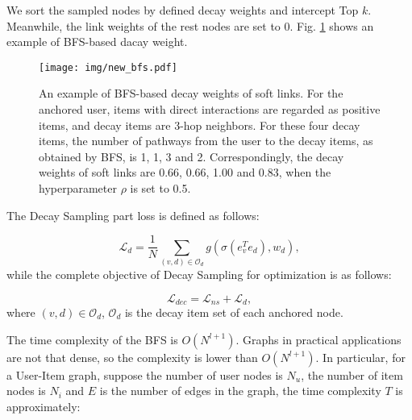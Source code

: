 We sort the sampled nodes by defined decay weights and intercept Top $k$. Meanwhile, the link weights of the rest nodes are set to 0. 
Fig. \ref{fig:decayf} shows an example of BFS-based dacay weight.

\begin{figure}[t]
\centering
\texttt{[image: img/new\_bfs.pdf]}
\caption{An example of BFS-based decay weights of soft links. For the anchored user, items with direct interactions are regarded as positive items, and decay items are 3-hop neighbors. For these four decay items, the number of pathways from the user to the decay items, as obtained by BFS, is 1, 1, 3 and 2. Correspondingly, the decay weights of soft links are 0.66, 0.66, 1.00 and 0.83, when  the hyperparameter \(\rho\) is set to 0.5.} 
\label{fig:decayf} 
\end{figure}

The Decay Sampling part loss is defined as follows:
 
\begin{equation}
\mathcal{L}_{d}= \frac{1}{N}\sum_{(v,d) \in\mathcal{O}_d} g\left(\sigma\left(e_v^T e_{d}\right), w_d\right),
\end{equation}
while the complete objective of Decay Sampling for optimization is as follows:

\begin{equation}\label{linkdecay}
\mathcal{L}_{dec}=\mathcal{L}_{ns}+ \mathcal{L}_{d},
\end{equation}
where $(v,d)\in \mathcal{O}_d$, $\mathcal{O}_d $ is the decay item set of each anchored node. 


The time complexity of the BFS is $O(N ^{l+1})$.
Graphs in practical applications are not that dense, so the complexity is lower than $O( N^{l+1})$.
In particular, for a User-Item graph, suppose the number of user nodes is $N_u$, the number of item nodes is $N_i$ and $E$ is the number of edges in the graph, the time complexity $T$ is approximately:

